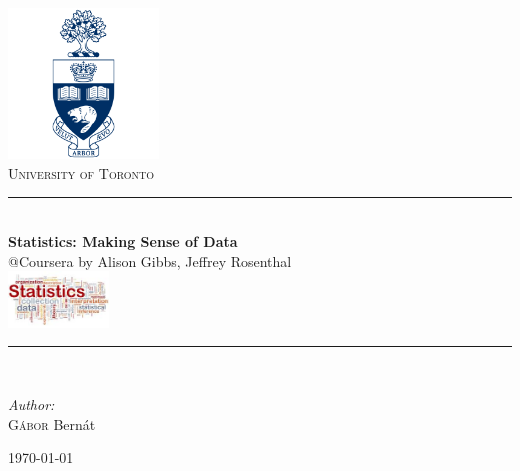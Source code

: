 \hypersetup{pageanchor=false}
\begin{titlepage}
\newcommand{\HRule}{\rule{\linewidth}{0.5mm}}
\begin{center}

\includegraphics[width=0.3\textwidth]{./img/university-of-toronto-logo.png}\\
\textsc{University of Toronto}\\

\HRule \\[0.4cm]
{ \huge \bfseries Statistics: Making Sense of Data }\\[0.4cm]
{@Coursera by Alison Gibbs, Jeffrey Rosenthal} \\
\includegraphics[width=0.2\textwidth]{./img/introstatslogocropped.jpg}\\
\HRule \\[1.5cm]

\begin{minipage}{0.4\textwidth}
\begin{flushleft} \large
\emph{Author:}\\
\textsc{Gábor} Bernát
\end{flushleft}
\end{minipage}

\vfill
{\large \today}
\end{center}
\end{titlepage}
\hypersetup{pageanchor=false}
